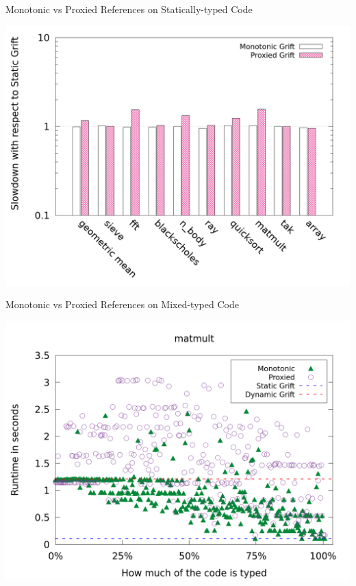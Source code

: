 \documentclass[12pt,dvipsnames]{beamer}
\begin{document}
\begin{frame}{Monotonic vs Proxied References on Statically-typed Code}
  \begin{center}
    \includegraphics[scale=0.25]{plots/static.png}
  \end{center}
\end{frame}

\begin{frame}{Monotonic vs Proxied References on Mixed-typed Code}
  \begin{center}
    \includegraphics[scale=0.25]{plots/fine/Specialized_Coercions_Lazy/runtimes/matmult.png}
  \end{center}
\end{frame}
\end{document}
